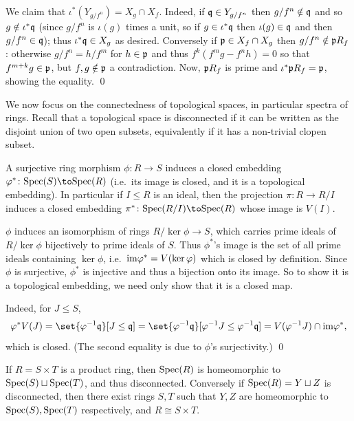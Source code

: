     We claim that $\iota^*(Y_{g/f^n})=X_g\cap X_f$.
    Indeed, if ${{\frak q}}\in Y_{g/f^n}$ then $g/f^n\notin{{\frak q}}$ and so $g\notin\iota^*{{\frak q}}$ (since $g/f^n$ is $\iota(g)$ times a unit, so if $g\in\iota^*{{\frak q}}$ then $\iota(g)\in{{\frak q}}$
    and then $g/f^n\in{{\frak q}}$); thus $\iota^*{{\frak q}}\in X_g$ as desired.
    Conversely if ${{\frak p}}\in X_f\cap X_g$ then $g/f^n\notin {{\frak p}} R_f$: otherwise $g/f^n=h/f^m$ for $h\in{{\frak p}}$ and thus $f^k(f^mg-f^nh)=0$ so that $f^{m+k}g\in{{\frak p}}$, but $f,g\notin{{\frak p}}$
    a contradiction.
    Now, ${{\frak p}} R_f$ is prime and $\iota^*{{\frak p}} R_f={{\frak p}}$, showing the equality.
    \qed

\eproof

We now focus on the connectedness of topological spaces, in particular spectra of rings.
Recall that a topological space is {\emphcolor disconnected} if it can be written as the disjoint union of two open subsets, equivalently if it has a non-trivial clopen subset.

\blemm

    A surjective ring morphism $\phi\colon R\to S$ induces a closed embedding $\phi^*\colon\spec(S)\to\spec(R)$ (i.e.\ its image is closed, and it is a topological embedding).
    In particular if $I\leq R$ is an ideal, then the projection $\pi\colon R\to R/I$ induces a closed embedding $\pi^*\colon\spec(R/I)\to\spec(R)$ whose image is $V(I)$.

\elemm

\bproof

    $\phi$ induces an isomorphism of rings $R/\ker\phi\to S$, which carries prime ideals of $R/\ker\phi$ bijectively to prime ideals of $S$.
    Thus $\phi^*$'s image is the set of all prime ideals containing $\ker\phi$, i.e.\ ${\rm im}\varphi^*=V(\mathop{\rm ker}\varphi)$ which is closed by definition.
    Since $\phi$ is surjective, $\phi^*$ is injective and thus a bijection onto its image.
    So to show it is a topological embedding, we need only show that it is a closed map.

    Indeed, for $J\leq S$,
    $$ \phi^*V(J) = \set{\phi^{-1}\q}[J\leq\q] = \set{\phi^{-1}\q}[\phi^{-1}J\leq\phi^{-1}\q] = V(\phi^{-1}J)\cap\im\phi^* , $$
    which is closed.
    (The second equality is due to $\phi$'s surjectivity.)
    \qed

\eproof

\bprop

    If $R=S\times T$ is a product ring, then ${\rm Spec}(R)$ is homeomorphic to ${\rm Spec}(S)\sqcup{\rm Spec}(T)$, and thus disconnected.
    Conversely if ${\rm Spec}(R)=Y\sqcup Z$ is disconnected, then there exist rings $S,T$ such that $Y,Z$ are homeomorphic to ${\rm Spec}(S),{\rm Spec}(T)$ respectively, and $R\cong S\times T$.

